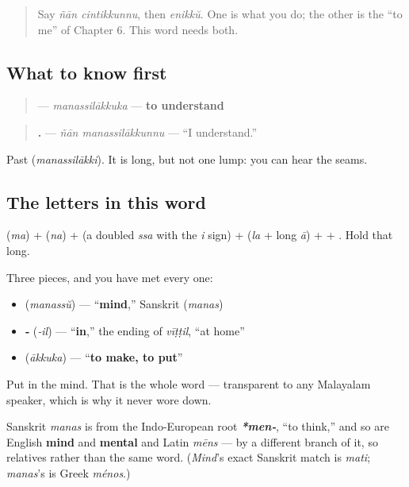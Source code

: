 \begin{quote}
Say \emph{ñān cintikkunnu}, then \emph{enikkŭ}. One is what you do; the other is the \textquotedblleft{}to me\textquotedblright{} of Chapter 6. This word needs both.
\end{quote}

\subsection*{What to know first}
\begin{quote}
\textbf{} — \emph{manassilākkuka} — \textbf{to understand}
\end{quote}

\begin{quote}
\textbf{ .} — \emph{ñān manassilākkunnu} — \textquotedblleft{}I understand.\textquotedblright{}
\end{quote}

Past \textbf{} (\emph{manassilākki}). It is long, but not one lump: you can hear the seams.

\subsection*{The letters in this word}
\textbf{} (\emph{ma}) + \textbf{} (\emph{na}) + \textbf{} (a doubled \textbf{} \emph{ssa} with the \emph{i} sign) + \textbf{} (\emph{la} + long \emph{ā}) + \textbf{} + \textbf{}. Hold that \textbf{} long.

\begin{cousinweb}
Three pieces, and you have met every one:

\begin{itemize}
\raggedright
  \item \textbf{} (\emph{manassŭ}) — \textquotedblleft{}\textbf{mind},\textquotedblright{} Sanskrit \textbf{} (\emph{manas})
  \item \textbf{‑} (\emph{‑il}) — \textquotedblleft{}\textbf{in},\textquotedblright{} the ending of \emph{vīṭṭil}, \textquotedblleft{}at home\textquotedblright{}
  \item \textbf{} (\emph{ākkuka}) — \textquotedblleft{}\textbf{to make, to put}\textquotedblright{}
\end{itemize}

Put in the mind. That is the whole word — transparent to any Malayalam speaker, which is why it never wore down.

Sanskrit \emph{manas} is from the Indo-European root \emph{\textbf{*men‑}}, \textquotedblleft{}to think,\textquotedblright{} and so are English \textbf{mind} and \textbf{mental} and Latin \emph{mēns} — by a different branch of it, so relatives rather than the same word. (\emph{Mind}'s exact Sanskrit match is \textbf{} \emph{mati}; \emph{manas}'s is Greek \emph{ménos}.)
\end{cousinweb}

